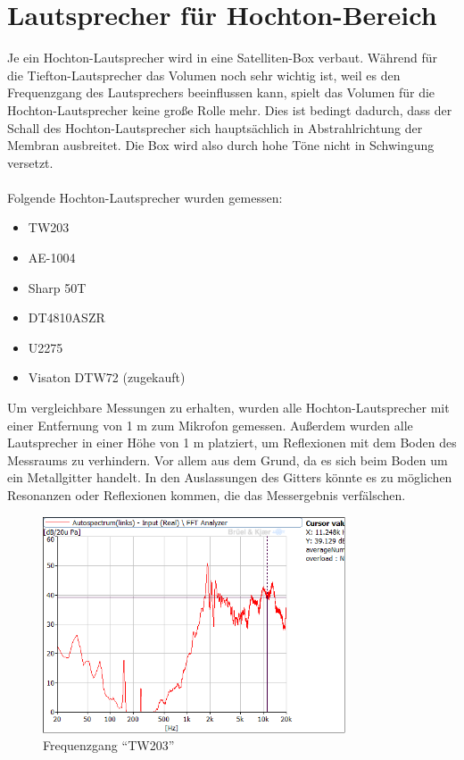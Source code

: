 
\newpage
\section{Lautsprecher für Hochton-Bereich}\label{sec:4.3}
Je ein Hochton-Lautsprecher wird in eine Satelliten-Box verbaut.
Während für die Tiefton-Lautsprecher das Volumen noch sehr wichtig ist, weil es den Frequenzgang des Lautsprechers beeinflussen kann, spielt das Volumen für die Hochton-Lautsprecher keine große Rolle mehr.
Dies ist bedingt dadurch, dass der Schall des Hochton-Lautsprecher sich hauptsächlich in Abstrahlrichtung der Membran ausbreitet.
Die Box wird also durch hohe Töne nicht in Schwingung versetzt.
\\ \\
Folgende Hochton-Lautsprecher wurden gemessen:
\begin{itemize}
	\item TW203
	\item AE-1004
	\item Sharp 50T
	\item DT4810ASZR
	\item U2275
	\item Visaton DTW72 (zugekauft)
\end{itemize}
Um vergleichbare Messungen zu erhalten, wurden alle Hochton-Lautsprecher mit einer Entfernung von 1 m zum Mikrofon gemessen.
Außerdem wurden alle Lautsprecher in einer Höhe von 1 m platziert, um Reflexionen mit dem Boden des Messraums zu verhindern.
Vor allem aus dem Grund, da es sich beim Boden um ein Metallgitter handelt.
In den Auslassungen des Gitters könnte es zu möglichen Resonanzen oder Reflexionen kommen, die das Messergebnis verfälschen.
\newpage

\begin{figure} [H]
	\centering
	\includegraphics[width=0.8\textwidth]{img/LSMessung/HT/TW203_1m_erhoeht.png}
	\caption{Frequenzgang \enquote{TW203}}
	\label{fig:4.3.1}
\end{figure}


